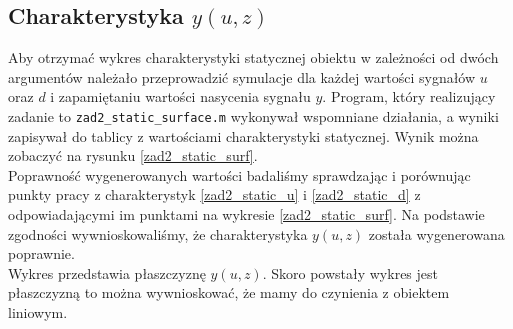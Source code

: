 \subsection{Charakterystyka $y(u,z)$}
Aby otrzymać wykres charakterystyki statycznej obiektu w zależności od dwóch argumentów należało przeprowadzić symulacje dla każdej wartości sygnałów $u$ oraz $d$ i zapamiętaniu wartości nasycenia sygnału $y$. Program, który realizujący zadanie to \verb+zad2_static_surface.m+ wykonywał wspomniane działania, a wyniki zapisywał do tablicy z wartościami charakterystyki statycznej. Wynik można zobaczyć na rysunku \ref{zad2_static_surf}.\\
\indent{} Poprawność wygenerowanych wartości badaliśmy sprawdzając i porównując punkty pracy z charakterystyk \ref{zad2_static_u} i \ref{zad2_static_d} z odpowiadającymi im punktami na wykresie \ref{zad2_static_surf}. Na podstawie zgodności wywnioskowaliśmy, że charakterystyka $y(u,z)$ została wygenerowana poprawnie.\\
\indent{} Wykres przedstawia płaszczyznę $y(u,z)$. Skoro powstały wykres jest płaszczyzną to można wywnioskować, że mamy do czynienia z obiektem liniowym. 

